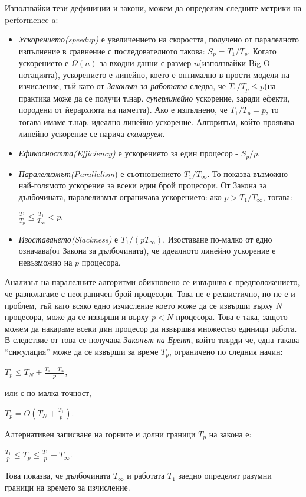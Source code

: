 \documentclass[11pt]{article} %
\begin{document}
Използвайки тези дефиниции и закони, можем да определим следните метрики на performence-a:
\begin{itemize}[noitemsep]
	\item \textit{Ускорението(speedup)} е увеличението на скоростта, получено от паралелното изпълнение в сравнение с последователното такова: $S_{p}=T_{1}/T_{p}$. Когато ускорението е $\Omega(n)$ за входни данни с размер $n$(използвайки Big O нотацията), ускорението е линейно, което е оптимално в прости модели на изчисление, тъй като от \textit{Законът за работата} следва, че $T_{1}/T_{p}\leq p$(на практика може да се получи т.нар. \textit{суперлинейно} ускорение, заради ефекти, породени от йерархията на паметта). Ако е изпълнено, че $T_{1}/T_{p}=p$, то тогава имаме т.нар. идеално линейно ускорение. Алгоритъм, който проявява линейно ускорение се нарича \textit{скалируем}.
	\item \textit{Ефикасността(Efficiency)} е ускорението за един процесор - $S_{p}/p$.
	\item \textit{Паралелизмът(Parallelism}) е съотношението $T_{1}/T_{\infty}$. То показва възможно най-голямото ускорение за всеки един брой процесори. От Закона за дълбочината, паралелизмът ограничава ускорението: ако $p > T_{1}/T_{\infty}$, тогава:\\
		\centerline{$\displaystyle \frac{T_{1}}{T_{p}}\leq \frac{T_{1}}{T_{\infty}} < p$.}
	\item \textit{Изоставането(Slackness)} е $T_{1}/(pT_{\infty})$. Изоставане по-малко от едно означава(от Закона за дълбочината), че идеалното линейно ускорение е невъзможно на $p$ процесора. 
\end{itemize}

Анализът на паралелните алгоритми обикновено се извършва с предположението, че разполагаме с неограничен брой процесори. Това не е релаистично, но не е и проблем, тъй като всяко едно изчисление което може да се извърши върху $N$ процесора, може да се извърши и върху $p < N$ процесора. Това е така, защото можем да накараме всеки дин процесор да извършва множество единици работа. В следствие от това се получава \textit{Законът на Брент}, който твърди че, една такава \enquote{симулация} може да се извърши за време $T_{p}$, ограничено по следния начин:\\
\centerline{$\displaystyle T_{p}\leq T_{N} + \frac{T_{1}-T_{N}}{p}$,}
или с по малка-точност,\\
\centerline{$\displaystyle T_{p}=O(T_{N}+\frac{T_{1}}{p})$.}
Алтернативен записване на горните и долни граници $T_{p}$ на закона е:\\
\centerline{$\displaystyle \frac{T_{1}}{p}\leq T_{p}\leq \frac{T_{1}}{p} + T_{\infty}$.}
Това показва, че дълбочината $T_{\infty}$ и работата $T_{1}$ заедно определят разумни граници на времето за изчисление. 
 
\end{document}
